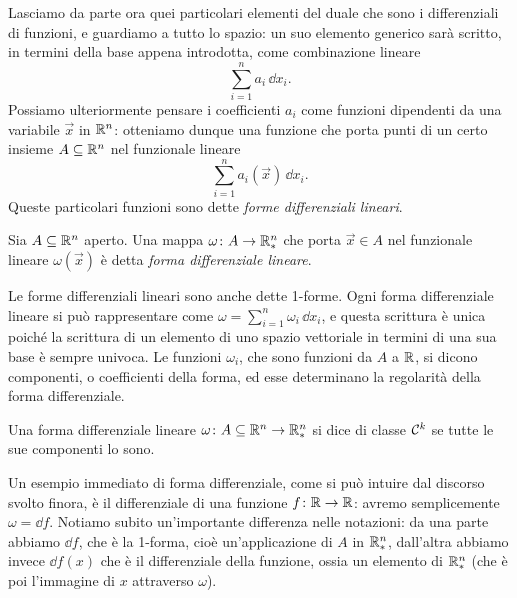 Lasciamo da parte ora quei particolari elementi del duale che sono i differenziali di funzioni, e guardiamo a tutto lo spazio: un suo elemento generico sarà scritto, in termini della base appena introdotta, come combinazione lineare
\begin{equation*}
	\sum_{i=1}^na_i\,\dd x_i.
\end{equation*}
Possiamo ulteriormente pensare i coefficienti $a_i$ come funzioni dipendenti da una variabile $\vec x$ in $\mathbb{R}^n$: otteniamo dunque una funzione che porta punti di un certo insieme $A\subseteq\mathbb{R}^n$ nel funzionale lineare
\begin{equation*}
	\sum_{i=1}^na_i(\vec x)\,\dd x_i.
\end{equation*}
Queste particolari funzioni sono dette \emph{forme differenziali lineari}.

\begin{definizione} \label{d:forma-differenziale-lineare}
	Sia $A\subseteq\mathbb{R}^n$ aperto.
	Una mappa $\omega\colon A\to\mathbb{R}^n_*$ che porta $\vec x\in A$ nel funzionale lineare $\omega(\vec x)$ è detta \emph{forma differenziale lineare}.
\end{definizione}
Le forme differenziali lineari sono anche dette 1-forme.
Ogni forma differenziale lineare si può rappresentare come $\omega=\sum_{i=1}^n\omega_i\,\dd x_i$, e questa scrittura è unica poich\'e la scrittura di un elemento di uno spazio vettoriale in termini di una sua base è sempre univoca.
Le funzioni $\omega_i$, che sono funzioni da $A$ a $\mathbb{R}$, si dicono componenti, o coefficienti della forma, ed esse determinano la regolarità della forma differenziale.
\begin{definizione} \label{d:regolarita-1forme}
	Una forma differenziale lineare $\omega\colon A\subseteq\mathbb{R}^n\to\mathbb{R}^n_*$ si dice di classe $\mathcal{C}^{{k}}$ se tutte le sue componenti lo sono.
\end{definizione}

Un esempio immediato di forma differenziale, come si può intuire dal discorso svolto finora, è il differenziale di una funzione $f\colon\mathbb{R}\to\mathbb{R}$: avremo semplicemente $\omega=\dd f$.
Notiamo subito un'importante differenza nelle notazioni: da una parte abbiamo $\dd f$, che è la 1-forma, cioè un'applicazione di $A$ in $\mathbb{R}^n_*$, dall'altra abbiamo invece $\dd f(x)$ che è il differenziale della funzione, ossia un elemento di $\mathbb{R}^n_*$ (che è poi l'immagine di $x$ attraverso $\omega$).
